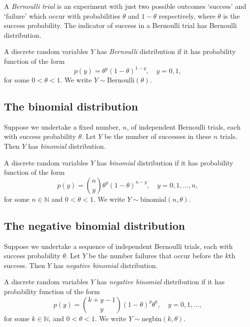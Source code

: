 \documentclass[]{book}
\theoremstyle{definition}
\theoremstyle{definition}
\theoremstyle{definition}
\theoremstyle{remark}
\let\BeginKnitrBlock\begin \let\EndKnitrBlock\end
\begin{document}
A \emph{Bernoulli trial} is an experiment with just two possible
outcomes `success' and `failure' which occur with probabilities
\(\theta\) and \(1- \theta\) respectively, where \(\theta\) is the
success probability. The indicator of success in a Bernoulli trial has
Bernoulli distribution.

\BeginKnitrBlock{definition}
\protect\hypertarget{def:unnamed-chunk-1}{}{\label{def:unnamed-chunk-1} }A
discrete random variables \(Y\) has \emph{Bernoulli} distribution if it
has probability function of the form
\[p(y) = \theta^y (1- \theta)^{1-y}, \quad y = 0, 1,\] for some
\(0 < \theta < 1\). We write \(Y \sim \text{Bernoulli}(\theta)\).
\EndKnitrBlock{definition}

\subsection{The binomial distribution}\label{the-binomial-distribution}

Suppose we undertake a fixed number, \(n\), of independent Bernoulli
trials, each with success probability \(\theta\). Let \(Y\) be the
number of successes in these \(n\) trials. Then \(Y\) has
\emph{binomial} distribution.

\BeginKnitrBlock{definition}
\protect\hypertarget{def:unnamed-chunk-2}{}{\label{def:unnamed-chunk-2} }A
discrete random variables \(Y\) has \emph{binomial} distribution if it
has probability function of the form
\[p(y) = \binom{n}{y} \theta^y (1 - \theta)^{n-y}, \quad y = 0, 1, \ldots, n,\]
for some \(n \in \mathbb{N}\) and \(0 < \theta < 1\). We write
\(Y \sim \text{binomial}(n, \theta)\).
\EndKnitrBlock{definition}

\subsection{The negative binomial
distribution}\label{the-negative-binomial-distribution}

Suppose we undertake a sequence of independent Bernoulli trials, each
with success probability \(\theta\). Let \(Y\) be the number failures
that occur before the \(k\)th success. Then \(Y\) has \emph{negative
binomial} distribution. \BeginKnitrBlock{definition}

\protect\hypertarget{def:unnamed-chunk-3}{}{\label{def:unnamed-chunk-3} }A
discrete random variables \(Y\) has \emph{negative binomial}
distribution if it has probability function of the form
\[p(y) = \binom{k + y - 1}{y} (1 - \theta)^y \theta^k, \quad
  y = 0, 1, \ldots,
\] for some \(k \in \mathbb{N}\), and \(0 < \theta < 1\). We write
\(Y \sim \text{negbin}(k, \theta)\).
\EndKnitrBlock{definition}
\end{document}
